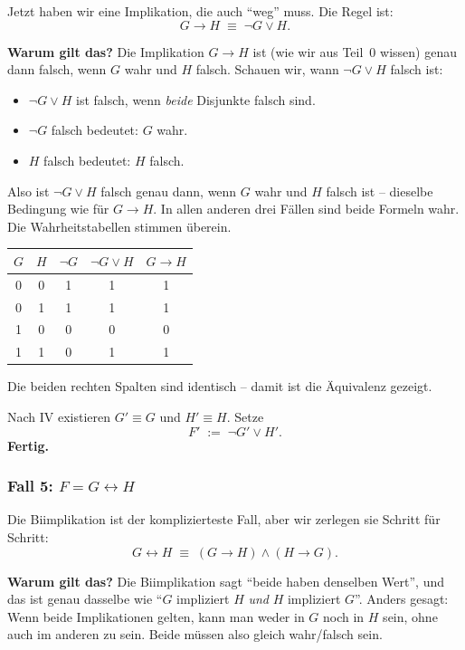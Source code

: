 \documentclass[a4paper,12pt]{article}
\begin{document}
Jetzt haben wir eine Implikation, die auch "`weg"' muss. Die Regel
ist:
\[
G \to H \;\equiv\; \neg G \vee H.
\]

\textbf{Warum gilt das?} Die Implikation $G \to H$ ist (wie wir aus
Teil~0 wissen) genau dann falsch, wenn $G$ wahr und $H$ falsch.
Schauen wir, wann $\neg G \vee H$ falsch ist:
\begin{itemize}[nosep]
\item $\neg G \vee H$ ist falsch, wenn \emph{beide} Disjunkte falsch
      sind.
\item $\neg G$ falsch bedeutet: $G$ wahr.
\item $H$ falsch bedeutet: $H$ falsch.
\end{itemize}
Also ist $\neg G \vee H$ falsch genau dann, wenn $G$ wahr und $H$
falsch ist -- dieselbe Bedingung wie f\"ur $G \to H$. In allen anderen
drei F\"allen sind beide Formeln wahr. Die Wahrheitstabellen stimmen
\"uberein. \checkmark

\begin{center}
\renewcommand{\arraystretch}{1.2}
\begin{tabular}{cc|c|c|c}
\toprule
$G$ & $H$ & $\neg G$ & $\neg G \vee H$ & $G \to H$ \\
\midrule
0 & 0 & 1 & 1 & 1 \\
0 & 1 & 1 & 1 & 1 \\
1 & 0 & 0 & 0 & 0 \\
1 & 1 & 0 & 1 & 1 \\
\bottomrule
\end{tabular}
\end{center}

Die beiden rechten Spalten sind identisch -- damit ist die
\"Aquivalenz gezeigt.

Nach IV existieren $G' \equiv G$ und $H' \equiv H$. Setze
\[
F' \;:=\; \neg G' \vee H'.
\]
\textbf{Fertig.}

\subsubsection*{Fall 5: $F = G \leftrightarrow H$}

Die Biimplikation ist der komplizierteste Fall, aber wir zerlegen
sie Schritt f\"ur Schritt:
\[
G \leftrightarrow H \;\equiv\; (G \to H) \wedge (H \to G).
\]

\textbf{Warum gilt das?} Die Biimplikation sagt "`beide haben
denselben Wert"', und das ist genau dasselbe wie "`$G$ impliziert $H$
\emph{und} $H$ impliziert $G$"'. Anders gesagt: Wenn beide Implikationen
gelten, kann man weder in $G$ noch in $H$ sein, ohne auch im anderen
zu sein. Beide m\"ussen also gleich wahr/falsch sein.
\end{document}
